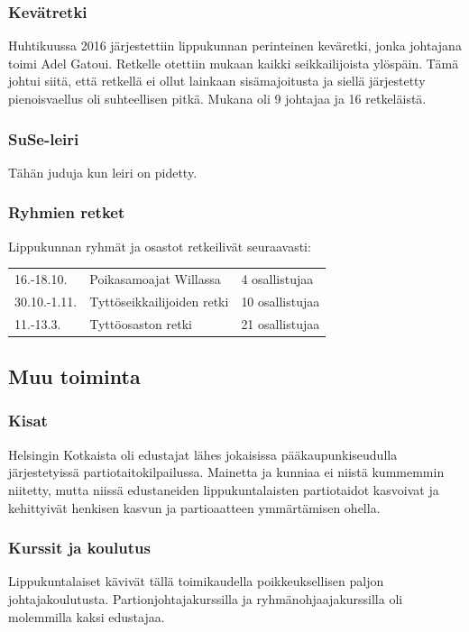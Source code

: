 \documentclass[a4paper, 12pt, finnish]{report} %
\begin{document}
\subsubsection{Kevätretki}
Huhtikuussa 2016 järjestettiin lippukunnan perinteinen keväretki, jonka johtajana toimi Adel Gatoui. Retkelle otettiin mukaan kaikki seikkailijoista ylöspäin. Tämä johtui siitä, että retkellä ei ollut lainkaan sisämajoitusta ja siellä järjestetty pienoisvaellus oli suhteellisen pitkä. Mukana oli 9 johtajaa ja 16 retkeläistä.
\subsubsection{SuSe-leiri}
Tähän juduja kun leiri on pidetty.
\subsubsection{Ryhmien retket}
Lippukunnan ryhmät ja osastot retkeilivät seuraavasti:
\begin{center}
	\begin{tabular}{l l l}
		16.-18.10. & Poikasamoajat Willassa & 4 osallistujaa\\
		30.10.-1.11. & Tyttöseikkailijoiden retki & 10 osallistujaa\\
		11.-13.3. & Tyttöosaston retki & 21 osallistujaa\\
	\end{tabular}
\end{center}
\subsection{Muu toiminta}
\subsubsection{Kisat}
Helsingin Kotkaista oli edustajat lähes jokaisissa pääkaupunkiseudulla järjestetyissä partiotaitokilpailussa. Mainetta ja kunniaa ei niistä kummemmin niitetty, mutta niissä edustaneiden lippukuntalaisten partiotaidot kasvoivat ja kehittyivät henkisen kasvun ja partioaatteen ymmärtämisen ohella.
\subsubsection{Kurssit ja koulutus}
Lippukuntalaiset kävivät tällä toimikaudella poikkeuksellisen paljon johtajakoulutusta. Partionjohtajakurssilla ja ryhmänohjaajakurssilla oli molemmilla kaksi edustajaa.
\end{document}
